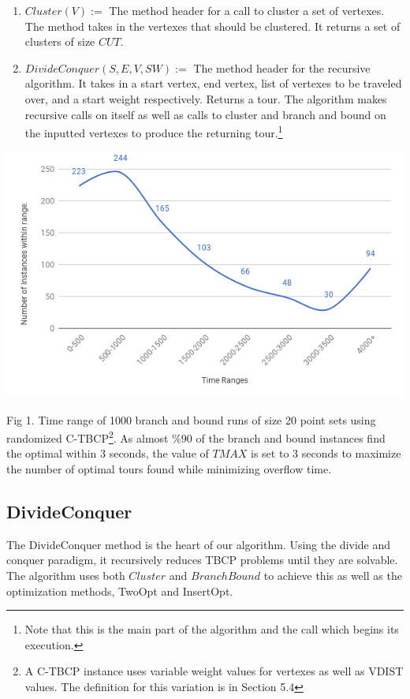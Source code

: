 \documentclass[sigconf, anonymous, pdftex]{acmart}
\begin{document}
\begin{enumerate}
    \item $Cluster(V) :=$ The method header for a call to cluster a set of vertexes. The method takes in the vertexes that should be clustered. It returns a set of clusters of size $CUT$.
    
    \item $DivideConquer(S, E, V, SW) :=$ The method header for the recursive algorithm. It takes in a start vertex, end vertex, list of vertexes to be traveled over, and a start weight respectively. Returns a tour. The algorithm makes recursive calls on itself as well as calls to cluster and branch and bound on the inputted vertexes to produce the returning tour.\footnote{Note that this is the main part of the algorithm and the call which begins its execution.}
    
    
\end{enumerate}

    \includegraphics[scale=.38]{bbTime}
    
    Fig 1. Time range of 1000 branch and bound runs of size 20 point sets using randomized C-TBCP\footnote{A C-TBCP instance uses variable weight values for vertexes as well as VDIST values. The definition for this variation is in Section 5.4}. As almost $\%90$ of the branch and bound instances find the optimal within 3 seconds, the value of $TMAX$ is set to 3 seconds to maximize the number of optimal tours found while minimizing overflow time.

\subsection{DivideConquer}

The DivideConquer method is the heart of our algorithm. Using the divide and conquer paradigm, it recursively reduces TBCP problems until they are solvable. The algorithm uses both $Cluster$ and $BranchBound$ to achieve this as well as the optimization methods, TwoOpt and InsertOpt.\\
\end{document}
